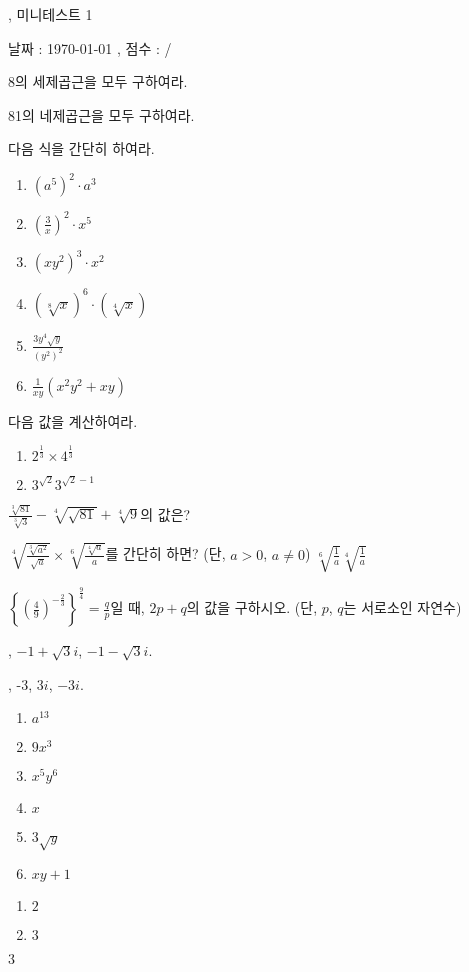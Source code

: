 \documentclass[a4paper]{oblivoir}
\begin{document}
\begin{center}
, 미니테스트 1
\end{center}
\begin{center}
날짜 : \today
,\qquad
점수 :  / 
\end{center}

%
\prob
8의 세제곱근을 모두 구하여라.
\vs

%
\prob
81의 네제곱근을 모두 구하여라.

%
\prob
다음 식을 간단히 하여라.
\begin{enumerate}[(1)]
\item
\((a^5)^2\cdot a^3\)
\item
\((\frac3x)^2\cdot x^5\)
\item
\((xy^2)^3\cdot x^2\)
\item
\((\sqrt[8]{x})^6\cdot(\sqrt[4]{x})\)
\item
\(\frac{3y^4\sqrt y}{(y^2)^2}\)
\item
\(\frac1{xy}\left(x^2y^2+xy\right)\)
\end{enumerate}

%
\prob
다음 값을 계산하여라.
\begin{enumerate}[(1)]
\item
\(2^{\frac13}\times4^{\frac13}\)
\item
\(3^{\sqrt2}3^{\sqrt2-1}\)
\end{enumerate}

%
\prob
\(\displaystyle\frac{\sqrt[3]{81}}{\sqrt[3]{3}}-\sqrt[4]{\sqrt{81}}+\sqrt[4]9\)의 값은?

%
\prob
\(\displaystyle\sqrt[4]{\frac{\sqrt[3]{a^2}}{\sqrt a}}\times\sqrt[6]{\frac{\sqrt[4]a}a}\)를 간단히 하면? (단, $a>0$, \(a\neq0\))
{\(\sqrt[6]{\frac1a}\)}{\(\sqrt[4]{\frac1a}\)}

%
\prob
\(\displaystyle\left\{\left(\frac49\right)^{-\frac23}\right\}^{\frac94}=\frac qp\)일 때, \(2p+q\)의 값을 구하시오.
(단, \(p\), \(q\)는 서로소인 자연수)

\newpage
\setcounter{num}{0}

%
, \(-1+\sqrt3i\), \(-1-\sqrt3i\).

%
, -3, $3i$, $-3i$.

%
\ans
\begin{enumerate}[(1)]
\item
\(a^{13}\)
\item
\(9x^3\)
\item
\(x^5y^6\)
\item
\(x\)
\item
\(3\sqrt y\)
\item
\(xy+1\)
\end{enumerate}

%
\ans
\begin{enumerate}[(1)]
\item
\(2\)
\item
\(3\)
\end{enumerate}

%
\ans
$3$

%
\ans
\one

%
\end{document}
